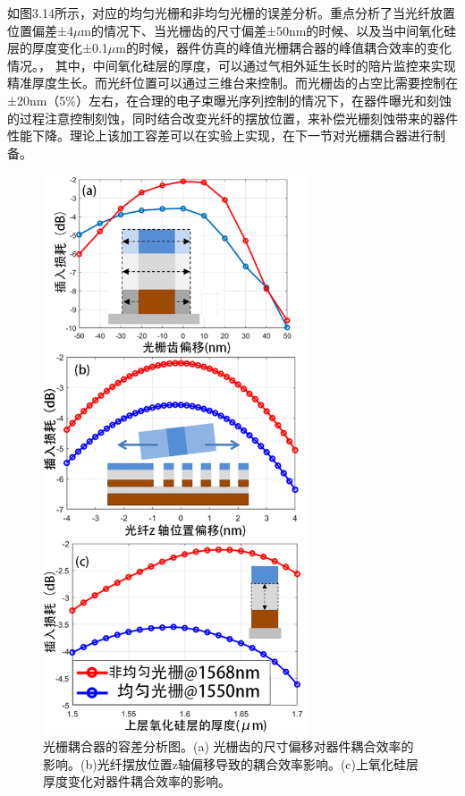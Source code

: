 如图3.14所示，对应的均匀光栅和非均匀光栅的误差分析。重点分析了当光纤放置位置偏差±4$\mu$m的情况下、当光栅齿的尺寸偏差±50nm的时候、以及当中间氧化硅层的厚度变化±0.1$\mu$m的时候，器件仿真的峰值光栅耦合器的峰值耦合效率的变化情况。，
其中，中间氧化硅层的厚度，可以通过气相外延生长时的陪片监控来实现精准厚度生长。而光纤位置可以通过三维台来控制。而光栅齿的占空比需要控制在±20nm（5\%）左右，在合理的电子束曝光序列控制的情况下，在器件曝光和刻蚀的过程注意控制刻蚀，同时结合改变光纤的摆放位置，来补偿光栅刻蚀带来的器件性能下降。理论上该加工容差可以在实验上实现，在下一节对光栅耦合器进行制备。

\begin{figure}[!htbp]
    \centering
    \includegraphics[width=0.7\textwidth]{Img/3-14.png}
    \caption{光栅耦合器的容差分析图。(a) 光栅齿的尺寸偏移对器件耦合效率的影响。(b)光纤摆放位置z轴偏移导致的耦合效率影响。(c)上氧化硅层厚度变化对器件耦合效率的影响。}
    \label{fig:3-14}
\end{figure}


